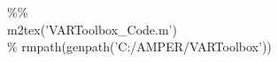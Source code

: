 \hspace{1mm}\hspace{5mm} \hspace{5mm} \hspace{5mm} \hspace{5mm} \hspace{5mm} \textcolor{matlabgreen}{\%}\textcolor{matlabgreen}{\% }\\ 
\hspace{1mm}\hspace{5mm} \hspace{5mm} \hspace{5mm} \hspace{5mm} \hspace{5mm} m2tex(\textcolor{matlabpurple}{'VARToolbox\_Code.m'}) \\ 
\hspace{1mm}\hspace{5mm} \hspace{5mm} \hspace{5mm} \hspace{5mm} \hspace{5mm} \textcolor{matlabgreen}{\% rmpath(genpath('C:/AMPER/VARToolbox')) }\\ 
\hspace{1mm}\hspace{5mm} \hspace{5mm} \hspace{5mm} \hspace{5mm} \hspace{5mm}  \\ 
\hspace{1mm}\hspace{5mm} \hspace{5mm} \hspace{5mm} \hspace{5mm} \hspace{5mm}  \\ 
